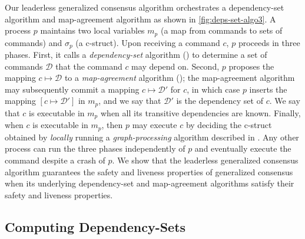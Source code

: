 Our leaderless generalized consensus algorithm orchestrates a dependency-set algorithm and map-agreement algorithm as shown in \cref{fig:deps-set-algo3}.
A process $p$ maintains two local variables $m_p$ (a map from commands to sets of commands) and $\sigma_p$ (a c-struct). Upon  receiving a command $c$, $p$ proceeds in three phases. First, it calls a \textit{dependency-set} algorithm () to determine a set of commands $\mathcal{D}$ that the command $c$ may depend on. Second, $p$ proposes the mapping  $c\mapsto \mathcal{D}$ to a \textit{map-agreement} algorithm (); the map-agreement algorithm may subsequently commit a mapping $c\mapsto \mathcal{D}'$ for $c$, in which case $p$ inserts the mapping $\left[c \mapsto \mathcal{D}'\right]$ in $m_p$, and we say that $\mathcal{D}'$ is the dependency set of $c$.
We say that $c$ is executable in $m_p$ when all its transitive dependencies are known. %
Finally, when $c$ is executable in $m_p$, then $p$ may execute $c$ by deciding the c-struct obtained by \emph{locally} running a \emph{graph-processing} algorithm described in .
Any other process can run the three phases independently of $p$ and eventually execute the command despite a crash of $p$.
We show that the leaderless  generalized consensus algorithm guarantees the safety and liveness properties of generalized consensus when its underlying dependency-set and map-agreement algorithms satisfy their safety and liveness properties.



\subsection{Computing Dependency-Sets}
\label{dep-algo}

